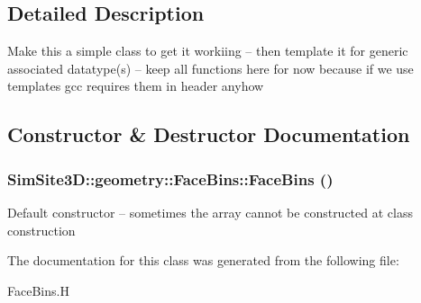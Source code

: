 \subsection{Detailed Description}
Make this a simple class to get it workiing -- then template it for generic associated datatype(s) -- keep all functions here for now because if we use templates gcc requires them in header anyhow 



\subsection{Constructor \& Destructor Documentation}
\subsubsection{\setlength{\rightskip}{0pt plus 5cm}SimSite3D::geometry::Face\-Bins::Face\-Bins ()\hspace{0.3cm}{\tt  [inline]}}\label{classSimSite3D_1_1geometry_1_1FaceBins_b059699dc81548d3ee80cb8d194a4445}


Default constructor -- sometimes the array cannot be constructed at class construction 

The documentation for this class was generated from the following file:\begin{CompactItemize}
\item 
Face\-Bins.H\end{CompactItemize}
